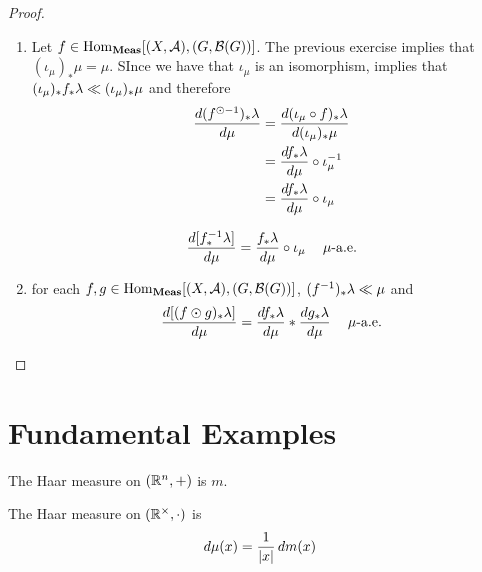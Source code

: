 \documentclass{book}
\begin{document}
	\begin{proof}\
		\begin{enumerate}
			\item Let $f \in \operatorname{Hom}_{\operatorname*{\text{\textbf{Meas}}}}[(X, \mathcal{A}), (G, \mathcal{B}(G))]$. The previous exercise implies that $(\iota_{\mu})_* \mu = \mu$. SInce we have that $\iota_{\mu}$ is an isomorphism,  implies that $(\iota_{\mu})_* f_*\lambda \ll (\iota_{\mu})_*\mu$ and therefore
			\begin{align*}
				\frac{d (f^{\odot -1})_*\lambda}{d \mu}
				& = \frac{d (\iota_{\mu} \circ f)_*\lambda}{d (\iota_{\mu})_*\mu} \\
				& = \frac{d f_*\lambda}{d \mu} \circ \iota_{\mu}^{-1} \\
				& = \frac{d f_*\lambda}{d \mu} \circ \iota_{\mu} \\
			\end{align*}

			$$\frac{d [f^{-1}_*\lambda]}{d \mu} = \frac{f_*\lambda }{d\mu} \circ \iota_{\mu} \text{ \hspace{.2cm} $\mu$-a.e.}$$ 
			\item for each $f,g \in \operatorname{Hom}_{\operatorname*{\text{\textbf{Meas}}}}[(X, \mathcal{A}), (G, \mathcal{B}(G))]$, $(f^{-1})_*\lambda \ll \mu$ and 
			$$\frac{d [(f \odot g)_*\lambda]}{d \mu} = \frac{d f_*\lambda }{d\mu} * \frac{d g_*\lambda }{d\mu} \text{ \hspace{.2cm} $\mu$-a.e.}$$ 
		\end{enumerate} 
	\end{proof}




	
	



	
	
	
	
	
	
	
	\newpage
	\section{Fundamental Examples}		
	
	\begin{note}
		The Haar measure on  $(\mathbb{R}^n, +)$ is $m$.
	\end{note}
	
	\begin{ex}  
		The Haar measure on $(\mathbb{R}^{\times}, \cdot)$  is $$d\mu(x) = \frac{1}{|x|} \, d m(x)$$
	\end{ex}
\end{document}
